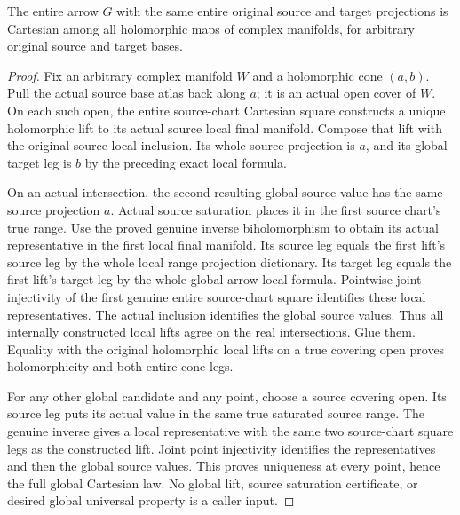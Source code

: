 \begin{theorem}
\label{hir:original-arbitrary-target-global-holomorphic-cartesian-smooth-square}
\leanok
{}
The entire arrow $G$ with the same entire original source and target
projections is Cartesian among all holomorphic maps of complex manifolds,
for arbitrary original source and target bases.
\end{theorem}
\begin{proof}
Fix an arbitrary complex manifold $W$ and a holomorphic cone $(a,b)$.
Pull the actual source base atlas back along $a$; it is an actual open
cover of $W$. On each such open, the entire source-chart Cartesian square
constructs a unique holomorphic lift to its actual source local final
manifold. Compose that lift with the original source local inclusion.
Its whole source projection is $a$, and its global target leg is $b$ by
the preceding exact local formula.

On an actual intersection, the second resulting global source value has
the same source projection $a$. Actual source saturation places it in
the first source chart's true range. Use the proved genuine inverse
biholomorphism to obtain its actual representative in the first local
final manifold. Its source leg equals the first lift's source leg by
the whole local range projection dictionary. Its target leg equals the
first lift's target leg by the whole global arrow local formula. Pointwise
joint injectivity of the first genuine entire source-chart square identifies
these local representatives. The actual inclusion identifies the global
source values. Thus all internally constructed local lifts agree on the
real intersections. Glue them. Equality with the original holomorphic
local lifts on a true covering open proves holomorphicity and both
entire cone legs.

For any other global candidate and any point, choose a source covering
open. Its source leg puts its actual value in the same true saturated
source range. The genuine inverse gives a local representative with the
same two source-chart square legs as the constructed lift. Joint point
injectivity identifies the representatives and then the global source
values. This proves uniqueness at every point, hence the full global
Cartesian law. No global lift, source saturation certificate, or desired
global universal property is a caller input.
\end{proof}
